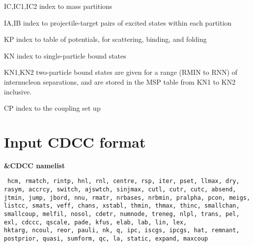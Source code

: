 \documentclass[11pt]{article}
\begin{document}
IC,IC1,IC2    index to mass partitions

IA,IB         index to projectile-target pairs of excited states
              within each partition

KP            index to table of potentials, for scattering, binding,
              and folding

KN            index to single-particle bound states

KN1,KN2       two-particle bound states are given for a range (RMIN to
              RNN) of internucleon separations, and are stored in the
              MSP table from KN1 to KN2 inclusive.

CP            index to the coupling set up

\newpage
\section{Input CDCC format}

{\bf \&CDCC namelist}

{\tt
hcm, rmatch, rintp, hnl, rnl, centre,  rsp, iter, pset, llmax,  dry,
rasym, accrcy, switch, ajswtch, sinjmax,  cutl, cutr, cutc,
absend, jtmin, jump, jbord, nnu,  rmatr, nrbases, nrbmin,  pralpha, pcon,  meigs,
listcc, smats, veff, chans, xstabl, thmin, thmax, thinc,
smallchan, smallcoup, melfil, nosol, cdetr, numnode, treneg,
nlpl, trans, pel, exl, cdccc, qscale, pade, kfus,
elab,  lab, lin, lex, \\
hktarg, ncoul, reor, pauli,  nk,
q, ipc, iscgs, ipcgs,  hat, remnant, postprior, quasi,
sumform, qc, la, static, expand, maxcoup
}\\
\end{document}
